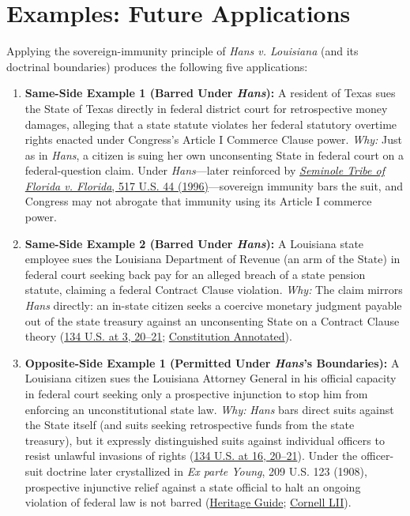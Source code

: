 \documentclass[12pt]{article}
\begin{document}
\section{Examples: Future Applications}
Applying the sovereign-immunity principle of \textit{Hans v. Louisiana} (and its doctrinal boundaries) produces the following five applications:

\begin{enumerate}
\item \textbf{Same-Side Example 1 (Barred Under \textit{Hans}):} A resident of Texas sues the State of Texas directly in federal district court for retrospective money damages, alleging that a state statute violates her federal statutory overtime rights enacted under Congress's Article I Commerce Clause power. \textit{Why:} Just as in \textit{Hans}, a citizen is suing her own unconsenting State in federal court on a federal-question claim. Under \textit{Hans}---later reinforced by \href{https://texaslawreview.org/state-sovereign-immunity-after-the-revolution/}{\textit{Seminole Tribe of Florida v. Florida}, 517 U.S. 44 (1996)}---sovereign immunity bars the suit, and Congress may not abrogate that immunity using its Article I commerce power.

\item \textbf{Same-Side Example 2 (Barred Under \textit{Hans}):} A Louisiana state employee sues the Louisiana Department of Revenue (an arm of the State) in federal court seeking back pay for an alleged breach of a state pension statute, claiming a federal Contract Clause violation. \textit{Why:} The claim mirrors \textit{Hans} directly: an in-state citizen seeks a coercive monetary judgment payable out of the state treasury against an unconsenting State on a Contract Clause theory (\href{https://supreme.justia.com/cases/federal/us/134/1/}{134 U.S. at 3, 20--21}; \href{https://constitution.congress.gov/browse/essay/amdt11-6-3/ALDE_00013684/}{Constitution Annotated}).

\item \textbf{Opposite-Side Example 1 (Permitted Under \textit{Hans}'s Boundaries):} A Louisiana citizen sues the Louisiana Attorney General in his official capacity in federal court seeking only a prospective injunction to stop him from enforcing an unconstitutional state law. \textit{Why:} \textit{Hans} bars direct suits against the State itself (and suits seeking retrospective funds from the state treasury), but it expressly distinguished suits against individual officers to resist unlawful invasions of rights (\href{https://supreme.justia.com/cases/federal/us/134/1/}{134 U.S. at 16, 20--21}). Under the officer-suit doctrine later crystallized in \textit{Ex parte Young}, 209 U.S. 123 (1908), prospective injunctive relief against a state official to halt an ongoing violation of federal law is not barred (\href{https://constitution.heritage.org/essays/amdt-11/}{Heritage Guide}; \href{https://www.law.cornell.edu/constitution-conan/amendment-11/exceptions-to-eleventh-amendment-immunity-officer-suits}{Cornell LII}).


\end{enumerate}
\end{document}
